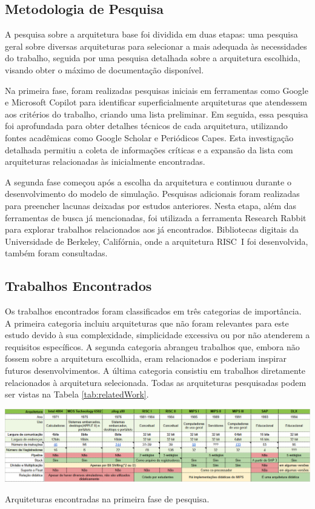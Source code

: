 \documentclass[
	12pt,				%
	openright,			%
	oneside,			%
	a4paper,			%
	english,			%
	french,				%
	spanish,			%
	brazil,				%
	]{abntex2}
\begin{document}
\subsection{Metodologia de Pesquisa}

A pesquisa sobre a arquitetura base foi dividida em duas etapas: uma pesquisa geral sobre diversas arquiteturas para selecionar a mais adequada às necessidades do trabalho, seguida por uma pesquisa detalhada sobre a arquitetura escolhida, visando obter o máximo de documentação disponível.

Na primeira fase, foram realizadas pesquisas iniciais em ferramentas como Google e Microsoft Copilot para identificar superficialmente arquiteturas que atendessem aos critérios do trabalho, criando uma lista preliminar. Em seguida, essa pesquisa foi aprofundada para obter detalhes técnicos de cada arquitetura, utilizando fontes acadêmicas como Google Scholar e Periódicos Capes. Esta investigação detalhada permitiu a coleta de informações críticas e a expansão da lista com arquiteturas relacionadas às inicialmente encontradas. 

A segunda fase começou após a escolha da arquitetura e continuou durante o desenvolvimento do modelo de simulação. Pesquisas adicionais foram realizadas para preencher lacunas deixadas por estudos anteriores. Nesta etapa, além das ferramentas de busca já mencionadas, foi utilizada a ferramenta Research Rabbit para explorar trabalhos relacionados aos já encontrados. Bibliotecas digitais da Universidade de Berkeley, Califórnia, onde a arquitetura RISC~I foi desenvolvida, também foram consultadas.

\subsection{Trabalhos Encontrados}

Os trabalhos encontrados foram classificados em três categorias de importância. A primeira categoria incluiu arquiteturas que não foram relevantes para este estudo devido à sua complexidade, simplicidade excessiva ou por não atenderem a requisitos específicos. A segunda categoria abrangeu trabalhos que, embora não fossem sobre a arquitetura escolhida, eram relacionados e poderiam inspirar futuros desenvolvimentos. A última categoria consistiu em trabalhos diretamente relacionados à arquitetura selecionada. Todas as arquiteturas pesquisadas podem ser vistas na Tabela \ref{tab:relatedWork}.

\begin{table}[!htp]\centering
    \centering
    \includegraphics[width=1\linewidth]{tabelaTrabalhosRelacionados.png}
    \caption{Arquiteturas encontradas na primeira fase de pesquisa.}
    \label{tab:relatedWork}
\end{table}
\end{document}
